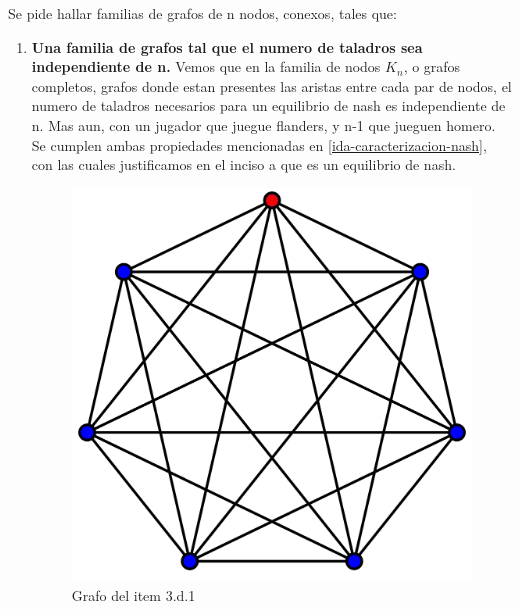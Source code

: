 Se pide hallar familias de grafos de n nodos, conexos, tales que:
\begin{enumerate}
	\item \textbf{Una familia de grafos tal que el numero de taladros sea independiente de n.} Vemos que en la familia de nodos $K_n$, o grafos completos, grafos donde estan presentes las aristas entre cada par de nodos, el numero de taladros necesarios para un equilibrio de nash es independiente de n. Mas aun, con un jugador que juegue flanders, y n-1 que jueguen homero. Se cumplen ambas propiedades mencionadas en \ref{ida-caracterizacion-nash}, con las cuales justificamos en el inciso a que es un equilibrio de nash.
	\begin{figure}[H]
	  \centering	
		\includegraphics[scale=0.20]{fig/Kn.png}
	  \caption{Grafo del item 3.d.1}
	\end{figure}


\end{enumerate}
